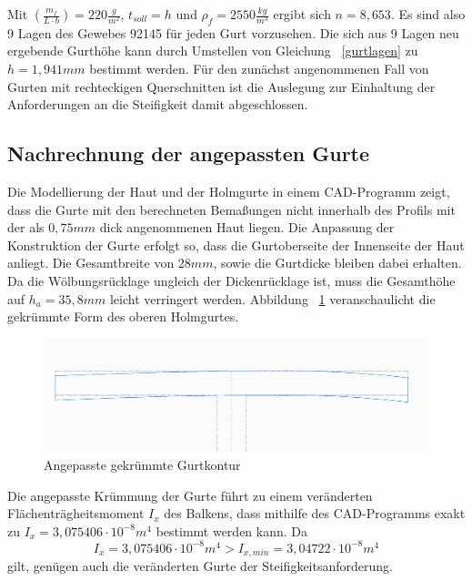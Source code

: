 \noindent Mit $ \left(\frac{m_{f}}{L\cdot b}\right) = 220\frac{g}{m^{2}} $, $ t_{soll}=h $ und $ \rho_{f}=2550\frac{kg}{m^{3}} $ ergibt sich $ n=8,653 $. Es sind also 9 Lagen des Gewebes 92145 für jeden Gurt vorzusehen. Die sich aus 9 Lagen neu ergebende Gurthöhe kann durch Umstellen von Gleichung ~\ref{gurtlagen} zu $h=1,941mm $ bestimmt werden. Für den zunächst angenommenen Fall von Gurten mit rechteckigen Querschnitten ist die Auslegung zur Einhaltung der Anforderungen an die Steifigkeit damit abgeschlossen.\\


\subsection{Nachrechnung der angepassten Gurte}
 Die Modellierung der Haut und der Holmgurte in einem CAD-Programm zeigt, dass die Gurte mit den berechneten Bemaßungen nicht innerhalb des Profils mit der als $ 0,75mm $ dick angenommenen Haut liegen. Die Anpassung der Konstruktion der Gurte erfolgt so, dass die Gurtoberseite der Innenseite der Haut anliegt. Die Gesamtbreite von $ 28mm $, sowie die Gurtdicke bleiben dabei erhalten. Da die Wölbungsrücklage ungleich der Dickenrücklage ist, muss die Gesamthöhe auf $ h_{a}=35,8mm $ leicht verringert werden. Abbildung ~\ref{fig: KrummerGurt} veranschaulicht die gekrümmte Form des oberen Holmgurtes.\\
 \begin{figure}[h]
 	\includegraphics[width=1.0\textwidth]{Bilder/KrummerGurt.jpg}
 	\caption{Angepasste gekrümmte Gurtkontur}
 	\label{fig: KrummerGurt}
 \end{figure}

\noindent Die angepasste Krümmung der Gurte führt zu einem veränderten Flächenträgheitsmoment ${I_{x}} $ des Balkens, dass mithilfe des CAD-Programms exakt zu ${I_{x}}=3,075406\cdot 10^{-8}m^{4} $ bestimmt werden kann. Da 
\begin{equation}
	\label{IVergleich}
	{I_{x}}=3,075406\cdot 10^{-8}m^{4} > I_{x,min}=3,04722\cdot 10^{-8}m^{4}
\end{equation}
gilt, genügen auch die veränderten Gurte der Steifigkeitsanforderung.\\
 
